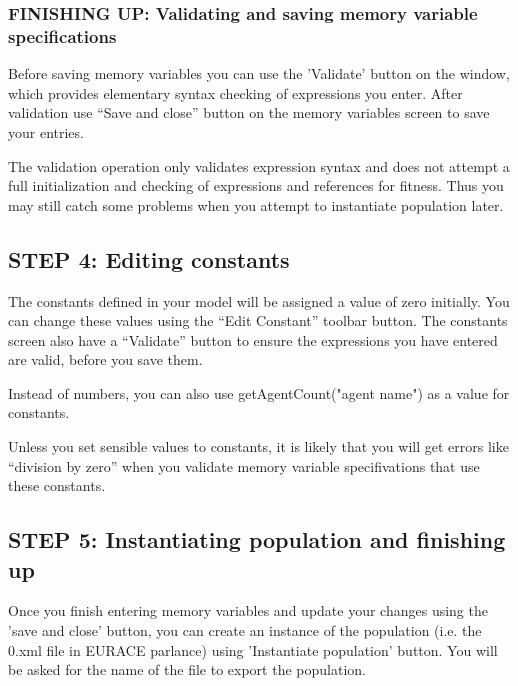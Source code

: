\documentclass{article}
\begin{document}
\subsubsection{FINISHING UP: Validating and saving memory variable specifications}
Before saving memory variables you can use the 'Validate' button on the window, which provides elementary syntax checking of expressions you enter. After validation use ``Save and close'' button on the memory variables screen to save your entries.

The validation operation only validates expression syntax and does not attempt a full initialization and checking of expressions and references for fitness. Thus you may still catch some problems when you attempt to instantiate population later.


\subsection{STEP 4: Editing constants}
The constants defined in your model will be assigned a value of zero initially. You can change these values using the ``Edit Constant'' toolbar button. The constants screen also have a ``Validate'' button to ensure the expressions you have entered are valid, before you save them.

Instead of numbers, you can also use getAgentCount("agent name") as a value for constants.

Unless you set sensible values to constants, it is likely that you will get errors like ``division by zero'' when you validate memory variable specifivations that use these constants.

\subsection{STEP 5: Instantiating population and finishing up}
Once you finish entering memory variables and update your changes using the 'save and close' button, you can create an instance of the population (i.e. the 0.xml file in EURACE parlance) using 'Instantiate population' button. You will be asked for the name of the file to export the population. 
\end{document}
